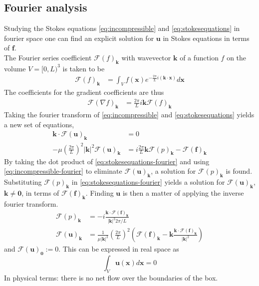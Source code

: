 \documentclass[a4paper,
twoside=false,abstract=false,numbers=noenddot,
titlepage=false,headings=small,parskip=half,version=last]{scrartcl}
\begin{document}
\subsection{Fourier analysis}
Studying the Stokes equations \eqref{eq:incompressible} and \eqref{eq:stokesequations} in fourier space one can find an explicit solution for $\mathbf{u}$ in Stokes equations in terms of $\mathbf{f}$.\\
The Fourier series coefficient $\mathcal{F}(f)_{\mathbf{k}}$ with wavevector $\mathbf{k}$ of a function $f$ on the volume $V=[0,L)^3$ is taken to be
\begin{align}%
\mathcal{F}(f)_{\mathbf{k}} &= \int_V f(\mathbf{x}) e^{-\frac{2\pi}{L}i(\mathbf{k}\cdot \mathbf{x})}d\mathbf{x}
    \label{eq:fourierdef}
\end{align}
The coefficients for the gradient coefficients are thus
\begin{align}
\mathcal{F}(\nabla f)_{\mathbf{k}} &= \frac{2\pi}{L}i\mathbf{k} \mathcal{F}(f)_{\mathbf{k}}
\end{align}
Taking the fourier transform of \eqref{eq:incompressible} and \eqref{eq:stokesequations} yields a new set of equations,
\begin{align}
\mathbf{k}\cdot \mathcal{F}(\mathbf{u})_\mathbf{k}&=0\label{eq:incompressible-fourier}\\
-\mu\left(\frac{2\pi}{L}\right)^2 |\mathbf{k}|^2 \mathcal{F}(\mathbf{u})_\mathbf{k} &= i\frac{2\pi}{L}\mathbf{k}\mathcal{F}(p)_\mathbf{k}-\mathcal{F}(\mathbf{f})_\mathbf{k}\label{eq:stokesequations-fourier}
\end{align}
By taking the dot product of \eqref{eq:stokesequations-fourier} and using \eqref{eq:incompressible-fourier} to eliminate $\mathcal{F}(\mathbf{u})_\mathbf{k}$, a solution for $\mathcal{F}(p)_\mathbf{k}$ is found.
Substituting $\mathcal{F}(p)_\mathbf{k}$ in \eqref{eq:stokesequations-fourier} yields a solution for $\mathcal{F}(\mathbf{u})_\mathbf{k}$, $\mathbf{k}\neq\mathbf{0}$, in terms of $\mathcal{F}(\mathbf{f})_\mathbf{k}$. Finding $\mathbf{u}$ is then a matter of applying the inverse fourier transform.
\begin{align}
\mathcal{F}(p)_\mathbf{k}&=-i\frac{\mathbf{k}\cdot \mathcal{F}(\mathbf{f})_\mathbf{k}}{|\mathbf{k}|^2 2\pi/L}\nonumber\\
\mathcal{F}(\mathbf{u})_\mathbf{k}&=\frac{1}{\mu|\mathbf{k}|^2}\left(\frac{2\pi}{L}\right)^2 \left(\mathcal{F}(\mathbf{f})_\mathbf{k} - \mathbf{k} \frac{\mathbf{k}\cdot \mathcal{F}(\mathbf{f})_\mathbf{k}}{|\mathbf{k}|^2}\right)\label{eq:stokessolution-fourier}
\end{align}
and $\mathcal{F}(\mathbf{u})_\mathbf{0}:=0$. This can be expressed in real space as
\begin{equation}
\int_V \mathbf{u}(\mathbf{x})d\mathbf{x} = 0
\end{equation}
In physical terms: there is no net flow over the boundaries of the box.
\end{document}
